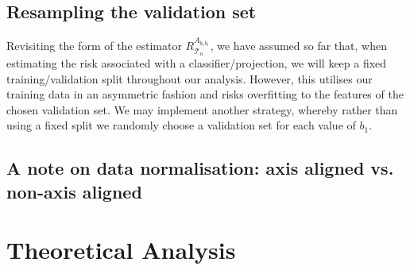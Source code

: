 \documentclass[12pt]{article}
\begin{document}
\subsection{Resampling the validation set}
Revisiting the form of the estimator $R^{A_{b_1b_1}}_{\mathcal{T}_n}$, we have assumed so far that, when estimating the risk associated with a classifier/projection, we will keep a fixed training/validation split throughout our analysis. However, this utilises our training data in an asymmetric fashion and risks overfitting to the features of the chosen validation set. We may implement another strategy, whereby rather than using a fixed split we randomly choose a validation set for each value of $b_1$.


\subsection{A note on data normalisation: axis aligned vs. non-axis aligned}
\section{Theoretical Analysis}
    


\citep{paulin_efronstein_2016}
\end{document}

